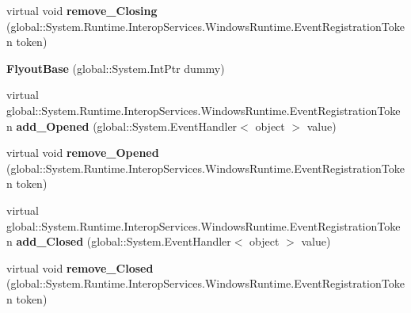 \begin{DoxyCompactItemize}
\item 
\mbox{\label{class_windows_1_1_u_i_1_1_xaml_1_1_controls_1_1_primitives_1_1_flyout_base_a3d2a27eaf9daaa9e54e906ae772bc53b}} 
virtual void {\bfseries remove\+\_\+\+Closing} (global\+::\+System.\+Runtime.\+Interop\+Services.\+Windows\+Runtime.\+Event\+Registration\+Token token)
\item 
\mbox{\label{class_windows_1_1_u_i_1_1_xaml_1_1_controls_1_1_primitives_1_1_flyout_base_aa5806d40967d26c2011e0427640dd885}} 
{\bfseries Flyout\+Base} (global\+::\+System.\+Int\+Ptr dummy)
\item 
\mbox{\label{class_windows_1_1_u_i_1_1_xaml_1_1_controls_1_1_primitives_1_1_flyout_base_a897348c50b44a1e97d0d95c49c1bd853}} 
virtual global\+::\+System.\+Runtime.\+Interop\+Services.\+Windows\+Runtime.\+Event\+Registration\+Token {\bfseries add\+\_\+\+Opened} (global\+::\+System.\+Event\+Handler$<$ object $>$ value)
\item 
\mbox{\label{class_windows_1_1_u_i_1_1_xaml_1_1_controls_1_1_primitives_1_1_flyout_base_a4bd2f94eb6ae77227752ea52d9497eb1}} 
virtual void {\bfseries remove\+\_\+\+Opened} (global\+::\+System.\+Runtime.\+Interop\+Services.\+Windows\+Runtime.\+Event\+Registration\+Token token)
\item 
\mbox{\label{class_windows_1_1_u_i_1_1_xaml_1_1_controls_1_1_primitives_1_1_flyout_base_a5f48a350689b2ef057ac2a870cfbbc9f}} 
virtual global\+::\+System.\+Runtime.\+Interop\+Services.\+Windows\+Runtime.\+Event\+Registration\+Token {\bfseries add\+\_\+\+Closed} (global\+::\+System.\+Event\+Handler$<$ object $>$ value)
\item 
\mbox{\label{class_windows_1_1_u_i_1_1_xaml_1_1_controls_1_1_primitives_1_1_flyout_base_a910f4919b18377849ddf436963142092}} 
virtual void {\bfseries remove\+\_\+\+Closed} (global\+::\+System.\+Runtime.\+Interop\+Services.\+Windows\+Runtime.\+Event\+Registration\+Token token)

\end{DoxyCompactItemize}

